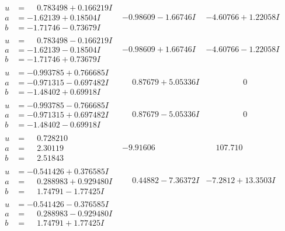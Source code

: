 \documentclass[1p]{elsarticle_modified}
\theoremstyle{definition}
\begin{document}
$$\begin{array}{c|c|c}
\begin{aligned}
u &= \phantom{-}0.783498 + 0.166219 I \\
a &= -1.62139 + 0.18504 I \\
b &= -1.71746 - 0.73679 I\end{aligned}
 & -0.98609 - 1.66746 I & -4.60766 + 1.22058 I \\ \hline\begin{aligned}
u &= \phantom{-}0.783498 - 0.166219 I \\
a &= -1.62139 - 0.18504 I \\
b &= -1.71746 + 0.73679 I\end{aligned}
 & -0.98609 + 1.66746 I & -4.60766 - 1.22058 I \\ \hline\begin{aligned}
u &= -0.993785 + 0.766685 I \\
a &= -0.971315 - 0.697482 I \\
b &= -1.48402 + 0.69918 I\end{aligned}
 & \phantom{-}0.87679 + 5.05336 I & \phantom{-0.000000 } 0 \\ \hline\begin{aligned}
u &= -0.993785 - 0.766685 I \\
a &= -0.971315 + 0.697482 I \\
b &= -1.48402 - 0.69918 I\end{aligned}
 & \phantom{-}0.87679 - 5.05336 I & \phantom{-0.000000 } 0 \\ \hline\begin{aligned}
u &= \phantom{-}0.728210\phantom{ +0.000000I} \\
a &= \phantom{-}2.30119\phantom{ +0.000000I} \\
b &= \phantom{-}2.51843\phantom{ +0.000000I}\end{aligned}
 & -9.91606\phantom{ +0.000000I} & \phantom{-}107.710\phantom{ +0.000000I} \\ \hline\begin{aligned}
u &= -0.541426 + 0.376585 I \\
a &= \phantom{-}0.288983 + 0.929480 I \\
b &= \phantom{-}1.74791 - 1.77425 I\end{aligned}
 & \phantom{-}0.44882 - 7.36372 I & -7.2812 + 13.3503 I \\ \hline\begin{aligned}
u &= -0.541426 - 0.376585 I \\
a &= \phantom{-}0.288983 - 0.929480 I \\
b &= \phantom{-}1.74791 + 1.77425 I\end{aligned}

\end{array}$$
\end{document}
